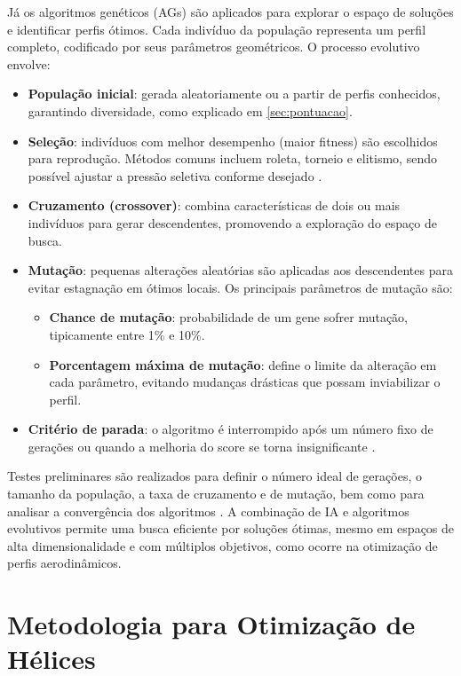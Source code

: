 Já os algoritmos genéticos (AGs) são aplicados para explorar o espaço de soluções e identificar perfis ótimos. Cada indivíduo da população representa um perfil completo, codificado por seus parâmetros geométricos. O processo evolutivo envolve:

\begin{itemize}
    \item \textbf{População inicial}: gerada aleatoriamente ou a partir de perfis conhecidos, garantindo diversidade, como explicado em \ref{sec:pontuacao}.
    \item \textbf{Seleção}: indivíduos com melhor desempenho (maior fitness) são escolhidos para reprodução. Métodos comuns incluem roleta, torneio e elitismo, sendo possível ajustar a pressão seletiva conforme desejado \cite{goldberg1989genetic}.
    \item \textbf{Cruzamento (crossover)}: combina características de dois ou mais indivíduos para gerar descendentes, promovendo a exploração do espaço de busca.
    \item \textbf{Mutação}: pequenas alterações aleatórias são aplicadas aos descendentes para evitar estagnação em ótimos locais. Os principais parâmetros de mutação são:
    \begin{itemize}
        \item \textbf{Chance de mutação}: probabilidade de um gene sofrer mutação, tipicamente entre 1\% e 10\%.
        \item \textbf{Porcentagem máxima de mutação}: define o limite da alteração em cada parâmetro, evitando mudanças drásticas que possam inviabilizar o perfil.
    \end{itemize}
    \item \textbf{Critério de parada}: o algoritmo é interrompido após um número fixo de gerações ou quando a melhoria do score se torna insignificante \cite{back1996evolutionary, oliveira2023}.
\end{itemize}

Testes preliminares são realizados para definir o número ideal de gerações, o tamanho da população, a taxa de cruzamento e de mutação, bem como para analisar a convergência dos algoritmos \cite{hasan2024, wu2024}. A combinação de IA e algoritmos evolutivos permite uma busca eficiente por soluções ótimas, mesmo em espaços de alta dimensionalidade e com múltiplos objetivos, como ocorre na otimização de perfis aerodinâmicos.
\section{Metodologia para Otimização de Hélices}

